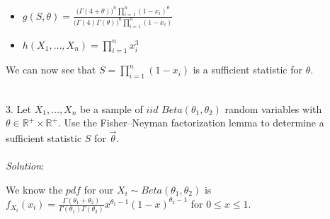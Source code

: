 \documentclass[12pt]{article}
\newcommand{\XB}{\color{black}}
\newcommand{\XBB}{\color{blue}}
\newcommand{\XV}{\color{violet}}
\begin{document}
\begin{itemize}
    \item $ \displaystyle g(S, \theta) = \frac{ \bigl( \Gamma(4 + \theta) \bigr)^{n} \prod_{i=1}^{n} (1 - x_{i})^{\theta}}{ \bigl( \Gamma(4)\Gamma(\theta) \bigr)^{n}\prod_{i=1}^{n} (1 - x_{i})} $
    \item $ \displaystyle h(X_{1}, \dots , X_{n}) = \prod_{i=1}^{n} x_{i}^{3} $
\end{itemize}

\noindent
We can now see that $ \displaystyle S = \prod_{i=1}^{n} (1 - x_{i}) $ is a sufficient statistic for $ \theta $.

\newpage
\XBB\hrulefill\XB \\

3. Let $ X_{1},\dots,X_{n} $ be a sample of $ iid $ $ Beta(\theta_{1}, \theta_{2}) $ random variables with $ \theta \in \mathbb{R}^{+} \times \mathbb{R}^{+} $.
Use the Fisher–Neyman factorization lemma to determine a sufficient statistic $ S $ for $ \overrightarrow{\theta} $. \\

\XBB\hrulefill\XB
\vspace{5mm} \\


\textit{Solution}:
\vspace{2.5mm}

\noindent
We know the $ pdf $ for our $ \displaystyle X_{i} \sim Beta(\theta_{1}, \theta_{2}) $ is $ \displaystyle f_{X_{i}}(x_{i}) = \frac{\Gamma(\theta_{1} + \theta_{2})}{\Gamma(\theta_{1})\Gamma(\theta_{2})}x^{\theta_{1} - 1}(1 - x)^{\theta_{2} - 1} $ for $ 0 \leq x \leq 1 $. \\
\end{document}
